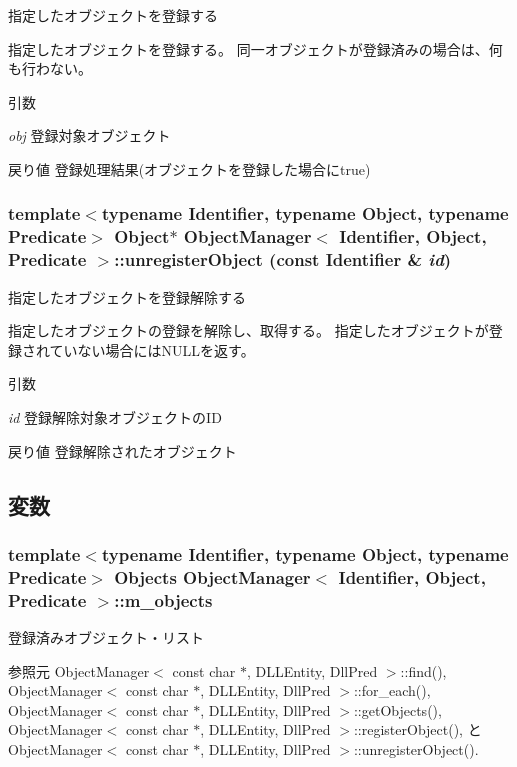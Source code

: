 指定したオブジェクトを登録する 

指定したオブジェクトを登録する。 同一オブジェクトが登録済みの場合は、何も行わない。


\begin{DoxyParams}{引数}
\item[{\em obj}]登録対象オブジェクト\end{DoxyParams}
\begin{DoxyReturn}{戻り値}
登録処理結果(オブジェクトを登録した場合にtrue) 
\end{DoxyReturn}
\subsubsection[{unregisterObject}]{\setlength{\rightskip}{0pt plus 5cm}template$<$typename Identifier, typename Object, typename Predicate$>$ Object$\ast$ {\bf ObjectManager}$<$ Identifier, Object, Predicate $>$::unregisterObject (const Identifier \& {\em id})\hspace{0.3cm}{\ttfamily  [inline]}}\label{classObjectManager_a082eb0fcf17aeb833a8e0d80c077229a}


指定したオブジェクトを登録解除する 

指定したオブジェクトの登録を解除し、取得する。 指定したオブジェクトが登録されていない場合にはNULLを返す。


\begin{DoxyParams}{引数}
\item[{\em id}]登録解除対象オブジェクトのID\end{DoxyParams}
\begin{DoxyReturn}{戻り値}
登録解除されたオブジェクト 
\end{DoxyReturn}


\subsection{変数}
\subsubsection[{m\_\-objects}]{\setlength{\rightskip}{0pt plus 5cm}template$<$typename Identifier, typename Object, typename Predicate$>$ {\bf Objects} {\bf ObjectManager}$<$ Identifier, Object, Predicate $>$::{\bf m\_\-objects}\hspace{0.3cm}{\ttfamily  [protected]}}\label{classObjectManager_ae0c7be9ecce476a588ffb884d663b3e8}


登録済みオブジェクト・リスト 



参照元 ObjectManager$<$ const char $\ast$, DLLEntity, DllPred $>$::find(), ObjectManager$<$ const char $\ast$, DLLEntity, DllPred $>$::for\_\-each(), ObjectManager$<$ const char $\ast$, DLLEntity, DllPred $>$::getObjects(), ObjectManager$<$ const char $\ast$, DLLEntity, DllPred $>$::registerObject(), と ObjectManager$<$ const char $\ast$, DLLEntity, DllPred $>$::unregisterObject().

